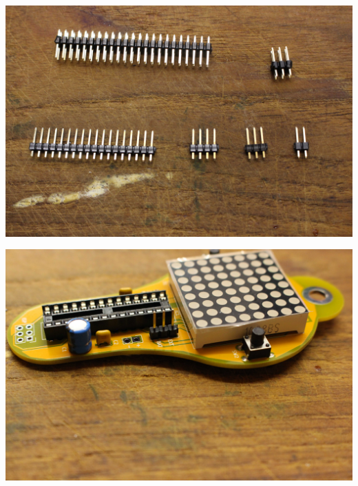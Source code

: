 \documentclass{article}
\begin{document}
\begin{minipage}[b]{0.5\textwidth}
	\includegraphics[width=\textwidth]{Bilder/IMG_5604.JPG}
	\label{fig:}
\end{minipage}
\begin{minipage}[b]{0.5\textwidth}
	\includegraphics[width=\textwidth]{Bilder/IMG_5605.JPG}
	\label{fig:}
\end{minipage}
\end{document}
